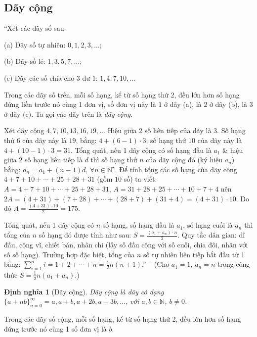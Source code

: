 \documentclass{article}
\numberwithin{equation}{section}
\newtheorem{dinhnghia}{Định nghĩa}[section]
\begin{document}
\subsection{Dãy cộng}
``Xét các dãy số sau:
\begin{enumerate*}
	\item[(a)] Dãy số tự nhiên: $0,1,2,3,\ldots$;
	\item[(b)] Dãy số lẻ: $1,3,5,7,\ldots$;
	\item[(c)] Dãy các số chia cho $3$ dư $1$: $1,4,7,10,\ldots$
\end{enumerate*}
Trong các dãy số trên, mỗi số hạng, kể từ số hạng thứ 2, đều lớn hơn số hạng đứng liền trước nó cùng 1 đơn vị, số đơn vị này là $1$ ở dãy (a), là $2$ ở dãy (b), là $3$ ở dãy (c). Ta gọi các dãy trên là \textit{dãy cộng}.

Xét dãy cộng $4,7,10,13,16,19,\ldots$ Hiệu giữa 2 số liên tiếp của dãy là $3$. Số hạng thứ 6 của dãy này là $19$, bằng: $4 + (6 - 1)\cdot3$; số hạng thứ $10$ của dãy này là $4 + (10 - 1)\cdot3 = 31$. Tổng quát, nếu 1 dãy cộng có số hạng đầu là $a_1$ \& hiệu giữa 2 số hạng liên tiếp là $d$ thì số hạng thứ $n$ của dãy cộng đó (ký hiệu $a_n$) bằng: $a_n = a_1 + (n - 1)d$, $\forall n\in\mathbb{N}^\star$. Để tính tổng các số hạng của dãy cộng $4 + 7 + 10 + \cdots + 25 + 28 + 31$ (gồm $10$ số) ta viết: $A = 4 + 7 + 10 + \cdots + 25 + 28 + 31$, $A = 31 + 28 + 25 + \cdots + 10 + 7 + 4$ nên $2A = (4 + 31) + (7 + 28) + \cdots + (28 + 7) + (31 + 4) = (4 + 31)\cdot10$. Do đó $A = \frac{(4 + 31)\cdot10}{2} = 175$.

Tổng quát, nếu 1 dãy cộng có $n$ số hạng, số hạng đầu là $a_1$, số hạng cuối là $a_n$ thì tổng của $n$ số hạng đó được tính như sau: $S = \frac{(a_1 + a_n)\cdot n}{2}$. Quy tắc dân gian: dĩ đầu, cộng vĩ, chiết bán, nhân chi (lấy số đầu cộng với số cuối, chia đôi, nhân với số số hạng). Trường hợp đặc biệt, tổng của $n$ số tự nhiên liên tiếp bắt đầu từ 1 bằng: $\sum_{i=1}^n i = 1 + 2 + \cdots + n = \frac{1}{2}n(n + 1)$.'' -- \cite[Chuyên đề 2, pp. 51--52]{Binh_Toan_6_tap_1} (Cho $a_1 = 1$, $a_n = n$ trong công thức $S = \frac{1}{2}n(a_1 + a_n)$.)

\begin{dinhnghia}[Dãy cộng]
	\emph{Dãy cộng} là dãy có dạng $\{a + n b\}_{n=0}^\infty = a, a + b, a + 2b, a + 3b,\ldots$, với $a,b\in\mathbb{N}$, $b\ne 0$.
\end{dinhnghia}
Trong các dãy số cộng, mỗi số hạng, kể từ số hạng thứ 2, đều lớn hơn số hạng đứng trước nó cùng 1 số đơn vị là $b$.
\end{document}
